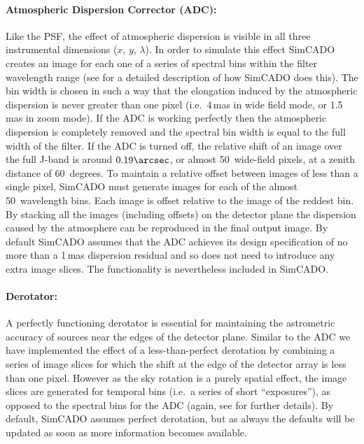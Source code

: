 \paragraph{Atmospheric Dispersion Corrector (ADC):} Like the PSF, the effect of atmospheric dispersion is visible in all three instrumental dimensions ($x$, $y$, $\lambda$). In order to simulate this effect SimCADO creates an image for each one of a series of spectral bins within the filter wavelength range (see \citealt{leschinski2016} for a detailed description of how SimCADO does this). The bin width is chosen in such a way that the elongation induced by the atmospheric dispersion is never greater than one pixel (i.e.\ 4\,mas in wide field mode, or 1.5\,mas in zoom mode). If the ADC is working perfectly then the atmospheric dispersion is completely removed and the spectral bin width is equal to the full width of the filter. If the ADC is turned off, the relative shift of an image over the full J-band is around $0.19\arcsec$, or almost 50~wide-field pixels, at a zenith distance of 60~degrees. To maintain a relative offset between images of less than a single pixel, SimCADO must generate images for each of the almost 50~wavelength bins. Each image is offset relative to the image of the reddest bin. By stacking all the images (including offsets) on the detector plane the dispersion caused by the atmosphere can be reproduced in the final output image. By default SimCADO assumes that the ADC achieves its design specification of no more than a 1\,mas dispersion residual and so does not need to introduce any extra image slices. The functionality is nevertheless included in SimCADO.

\paragraph{Derotator:} A perfectly functioning derotator is essential for maintaining the astrometric accuracy of sources near the edges of the detector plane. Similar to the ADC we have implemented the effect of a less-than-perfect derotation by combining a series of image slices for which the shift at the edge of the detector array is less than one pixel. However as the sky rotation is a purely spatial effect, the image slices are generated for temporal bins (i.e.\ a series of short ``exposures''), as opposed to the spectral bins for the ADC (again, see \citealt{leschinski2016} for further details). By default, SimCADO assumes perfect derotation, but as always the defaults will be updated as soon as more information becomes available.


